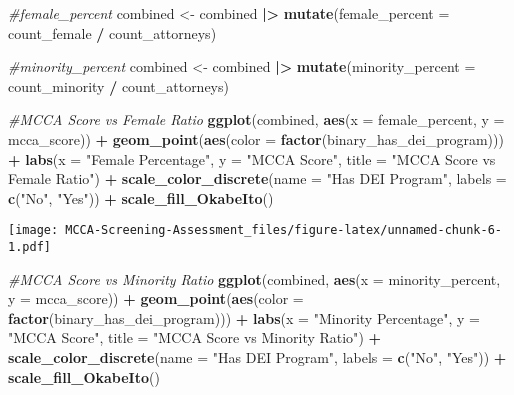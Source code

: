 \documentclass[
]{article}
\newenvironment{Shaded}{\begin{snugshade}}{\end{snugshade}}
\newcommand{\AttributeTok}[1]{\textcolor[rgb]{0.13,0.29,0.53}{#1}}
\newcommand{\CommentTok}[1]{\textcolor[rgb]{0.56,0.35,0.01}{\textit{#1}}}
\newcommand{\FunctionTok}[1]{\textcolor[rgb]{0.13,0.29,0.53}{\textbf{#1}}}
\newcommand{\NormalTok}[1]{#1}
\newcommand{\OtherTok}[1]{\textcolor[rgb]{0.56,0.35,0.01}{#1}}
\newcommand{\SpecialCharTok}[1]{\textcolor[rgb]{0.81,0.36,0.00}{\textbf{#1}}}
\newcommand{\StringTok}[1]{\textcolor[rgb]{0.31,0.60,0.02}{#1}}
\begin{document}
\begin{Shaded}
\begin{Highlighting}[]
\CommentTok{\#female\_percent}
\NormalTok{combined }\OtherTok{\textless{}{-}}\NormalTok{ combined }\SpecialCharTok{|\textgreater{}} 
  \FunctionTok{mutate}\NormalTok{(}\AttributeTok{female\_percent =}\NormalTok{ count\_female }\SpecialCharTok{/}\NormalTok{ count\_attorneys)}

\CommentTok{\#minority\_percent}
\NormalTok{combined }\OtherTok{\textless{}{-}}\NormalTok{ combined }\SpecialCharTok{|\textgreater{}} 
  \FunctionTok{mutate}\NormalTok{(}\AttributeTok{minority\_percent =}\NormalTok{ count\_minority }\SpecialCharTok{/}\NormalTok{ count\_attorneys)}

\CommentTok{\#MCCA Score vs Female Ratio}
\FunctionTok{ggplot}\NormalTok{(combined, }\FunctionTok{aes}\NormalTok{(}\AttributeTok{x =}\NormalTok{ female\_percent, }\AttributeTok{y =}\NormalTok{ mcca\_score)) }\SpecialCharTok{+}
  \FunctionTok{geom\_point}\NormalTok{(}\FunctionTok{aes}\NormalTok{(}\AttributeTok{color =} \FunctionTok{factor}\NormalTok{(binary\_has\_dei\_program))) }\SpecialCharTok{+}
  \FunctionTok{labs}\NormalTok{(}\AttributeTok{x =} \StringTok{"Female Percentage"}\NormalTok{, }
       \AttributeTok{y =} \StringTok{"MCCA Score"}\NormalTok{, }
       \AttributeTok{title =} \StringTok{"MCCA Score vs Female Ratio"}\NormalTok{) }\SpecialCharTok{+}
  \FunctionTok{scale\_color\_discrete}\NormalTok{(}\AttributeTok{name =} \StringTok{"Has DEI Program"}\NormalTok{, }\AttributeTok{labels =} \FunctionTok{c}\NormalTok{(}\StringTok{"No"}\NormalTok{, }\StringTok{"Yes"}\NormalTok{)) }\SpecialCharTok{+}
  \FunctionTok{scale\_fill\_OkabeIto}\NormalTok{()}
\end{Highlighting}
\end{Shaded}

\texttt{[image: MCCA-Screening-Assessment\_files/figure-latex/unnamed-chunk-6-1.pdf]}

\begin{Shaded}
\begin{Highlighting}[]
\CommentTok{\#MCCA Score vs Minority Ratio}
\FunctionTok{ggplot}\NormalTok{(combined, }\FunctionTok{aes}\NormalTok{(}\AttributeTok{x =}\NormalTok{ minority\_percent, }\AttributeTok{y =}\NormalTok{ mcca\_score)) }\SpecialCharTok{+}
  \FunctionTok{geom\_point}\NormalTok{(}\FunctionTok{aes}\NormalTok{(}\AttributeTok{color =} \FunctionTok{factor}\NormalTok{(binary\_has\_dei\_program))) }\SpecialCharTok{+}
  \FunctionTok{labs}\NormalTok{(}\AttributeTok{x =} \StringTok{"Minority Percentage"}\NormalTok{, }
       \AttributeTok{y =} \StringTok{"MCCA Score"}\NormalTok{, }
       \AttributeTok{title =} \StringTok{"MCCA Score vs Minority Ratio"}\NormalTok{) }\SpecialCharTok{+}
  \FunctionTok{scale\_color\_discrete}\NormalTok{(}\AttributeTok{name =} \StringTok{"Has DEI Program"}\NormalTok{, }\AttributeTok{labels =} \FunctionTok{c}\NormalTok{(}\StringTok{"No"}\NormalTok{, }\StringTok{"Yes"}\NormalTok{)) }\SpecialCharTok{+}
  \FunctionTok{scale\_fill\_OkabeIto}\NormalTok{()}
\end{Highlighting}
\end{Shaded}
\end{document}
